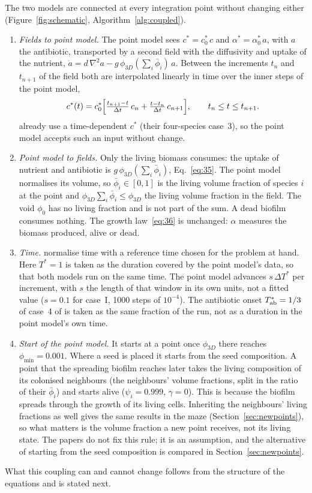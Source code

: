 \documentclass[11pt,a4paper]{article}
\newcommand{\phiD}{\phi_{3D}}
\newcommand{\lv}{\textstyle\sum_i\bar\phi_i}
\begin{document}
The two models are connected at every integration point without changing either (Figure~\ref{fig:schematic}, Algorithm~\ref{alg:coupled}).
\begin{enumerate}
\item \emph{Fields to point model.} The point model sees $c^*=c^*_0\,c$ and $\alpha^*=\alpha^*_0\,a$, with $a$ the antibiotic, transported by a second field with the diffusivity and uptake of the nutrient, $\dot a=d\,\nabla^2a-g\,\phiD(\lv)\,a$. Between the increments $t_n$ and $t_{n+1}$ of the field both are interpolated linearly in time over the inner steps of the point model,
\begin{equation}
c^*(t)=c^*_0\Bigl[\tfrac{t_{n+1}-t}{\Delta t}\,c_n+\tfrac{t-t_n}{\Delta t}\,c_{n+1}\Bigr],\qquad t_n\le t\le t_{n+1}.
\label{eq:cstar}
\end{equation}
\citet{Klempt2026ContinuumBacterialGrowth} already use a time-dependent $c^*$ (their four-species case~3), so the point model accepts such an input without change.
\item \emph{Point model to fields.} Only the living biomass consumes: the uptake of nutrient and antibiotic is $g\,\phiD(\lv)$, Eq.~\eqref{eq:35}. The point model normalises its volume, so $\bar\phi_i\in[0,1]$ is the living volume fraction of species $i$ at the point and $\phiD\lv\le\phiD$ the living volume fraction in the field. The void $\phi_0$ has no living fraction and is not part of the sum. A dead biofilm consumes nothing. The growth law~\eqref{eq:36} is unchanged: $\alpha$ measures the biomass produced, alive or dead.
\item \emph{Time.} \citet{Klempt2024DiffusionDrivenGrowth} normalise time with a reference time chosen for the problem at hand. Here $T^*=1$ is taken as the duration covered by the point model's data, so that both models run on the same time. The point model advances $s\,\Delta T^*$ per increment, with $s$ the length of that window in its own units, not a fitted value ($s=0.1$ for case~I, 1000 steps of $10^{-4}$). The antibiotic onset $T^*_{\rm ab}=1/3$ of case~4 of \citet{Klempt2026ContinuumBacterialGrowth} is taken as the same fraction of the run, not as a duration in the point model's own time.
\item \emph{Start of the point model.} It starts at a point once $\phiD$ there reaches $\phi_{\min}=0.001$. Where a seed is placed it starts from the seed composition. A point that the spreading biofilm reaches later takes the living composition of its colonised neighbours (the neighbours' volume fractions, split in the ratio of their $\bar\phi_i$) and starts alive ($\psi_i=0.999$, $\gamma=0$). This is because the biofilm spreads through the growth of its living cells. Inheriting the neighbours' living fractions as well gives the same results in the maze (Section~\ref{sec:newpoints}), so what matters is the volume fraction a new point receives, not its living state. The papers do not fix this rule; it is an assumption, and the alternative of starting from the seed composition is compared in Section~\ref{sec:newpoints}.
\end{enumerate}
What this coupling can and cannot change follows from the structure of the equations and is stated next.
\end{document}
